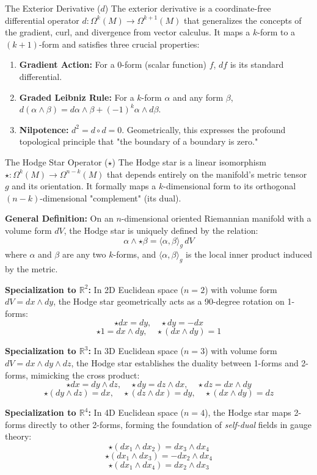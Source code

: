 \documentclass[11pt]{article}
\begin{document}
\begin{defbox}{The Exterior Derivative ($d$)}
The exterior derivative is a coordinate-free differential operator $d: \Omega^k(M) \to \Omega^{k+1}(M)$ that generalizes the concepts of the gradient, curl, and divergence from vector calculus. It maps a $k$-form to a $(k+1)$-form and satisfies three crucial properties:
\begin{enumerate}[noitemsep]
    \item \textbf{Gradient Action:} For a 0-form (scalar function) $f$, $df$ is its standard differential.
    \item \textbf{Graded Leibniz Rule:} For a $k$-form $\alpha$ and any form $\beta$, $d(\alpha \wedge \beta) = d\alpha \wedge \beta + (-1)^k \alpha \wedge d\beta$.
    \item \textbf{Nilpotence:} $d^2 = d \circ d = 0$. Geometrically, this expresses the profound topological principle that "the boundary of a boundary is zero."
\end{enumerate}
\end{defbox}

\begin{defbox}{The Hodge Star Operator ($\star$)}
The Hodge star is a linear isomorphism $\star: \Omega^k(M) \to \Omega^{n-k}(M)$ that depends entirely on the manifold's metric tensor $g$ and its orientation. It formally maps a $k$-dimensional form to its orthogonal $(n-k)$-dimensional "complement" (its dual).

\textbf{General Definition:} On an $n$-dimensional oriented Riemannian manifold with a volume form $dV$, the Hodge star is uniquely defined by the relation:
\[ \alpha \wedge \star\beta = \langle \alpha, \beta \rangle_g \, dV \]
where $\alpha$ and $\beta$ are any two $k$-forms, and $\langle \alpha, \beta \rangle_g$ is the local inner product induced by the metric.

\textbf{Specialization to $\mathbb{R}^2$:} In 2D Euclidean space ($n=2$) with volume form $dV = dx \wedge dy$, the Hodge star geometrically acts as a 90-degree rotation on 1-forms:
\[ \star dx = dy, \quad \star dy = -dx \]
\[ \star 1 = dx \wedge dy, \quad \star(dx \wedge dy) = 1 \]

\textbf{Specialization to $\mathbb{R}^3$:} In 3D Euclidean space ($n=3$) with volume form $dV = dx \wedge dy \wedge dz$, the Hodge star establishes the duality between 1-forms and 2-forms, mimicking the cross product:
\[ \star dx = dy \wedge dz, \quad \star dy = dz \wedge dx, \quad \star dz = dx \wedge dy \]
\[ \star(dy \wedge dz) = dx, \quad \star(dz \wedge dx) = dy, \quad \star(dx \wedge dy) = dz \]

\textbf{Specialization to $\mathbb{R}^4$:} In 4D Euclidean space ($n=4$), the Hodge star maps 2-forms directly to other 2-forms, forming the foundation of \textit{self-dual} fields in gauge theory:
\[ \star(dx_1 \wedge dx_2) = dx_3 \wedge dx_4 \]
\[ \star(dx_1 \wedge dx_3) = -dx_2 \wedge dx_4 \]
\[ \star(dx_1 \wedge dx_4) = dx_2 \wedge dx_3 \]
\end{defbox}
\end{document}
